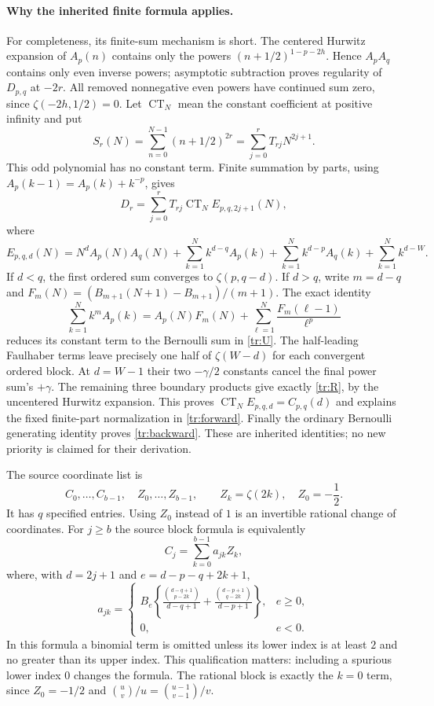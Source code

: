 \paragraph{Why the inherited finite formula applies.}
For completeness, its finite-sum mechanism is short. The centered
Hurwitz expansion of $A_p(n)$ contains only the powers
$(n+1/2)^{1-p-2h}$. Hence $A_pA_q$ contains only even inverse powers;
asymptotic subtraction proves regularity of $D_{p,q}$ at $-2r$.
All removed nonnegative even powers have continued sum zero, since
$\zeta(-2h,1/2)=0$. Let $\operatorname{CT}_N$ mean the constant
coefficient at positive infinity and put
\[
 S_r(N)=\sum_{n=0}^{N-1}(n+1/2)^{2r}
       =\sum_{j=0}^r T_{rj}N^{2j+1}.
\]
This odd polynomial has no constant term. Finite summation by parts,
using $A_p(k-1)=A_p(k)+k^{-p}$, gives
\[
 D_r=\sum_{j=0}^rT_{rj}\operatorname{CT}_N E_{p,q,2j+1}(N),
\]
where
\[
 E_{p,q,d}(N)=N^dA_p(N)A_q(N)
 +\sum_{k=1}^N k^{d-q}A_p(k)
 +\sum_{k=1}^N k^{d-p}A_q(k)
 +\sum_{k=1}^N k^{d-W}.
\]
If $d<q$, the first ordered sum converges to $\zeta(p,q-d)$.
If $d>q$, write $m=d-q$ and
$F_m(N)=(B_{m+1}(N+1)-B_{m+1})/(m+1)$. The exact identity
\[
 \sum_{k=1}^Nk^mA_p(k)
 =A_p(N)F_m(N)+\sum_{\ell=1}^N\frac{F_m(\ell-1)}{\ell^p}
\]
reduces its constant term to the Bernoulli sum in \eqref{tr:U}.
The half-leading Faulhaber terms leave precisely one half of
$\zeta(W-d)$ for each convergent ordered block. At $d=W-1$ their
two $-\gamma/2$ constants cancel the final power sum's $+\gamma$.
The remaining three boundary products give exactly \eqref{tr:R},
by the uncentered Hurwitz expansion. This proves
$\operatorname{CT}_NE_{p,q,d}=C_{p,q}(d)$ and explains the fixed
finite-part normalization in \eqref{tr:forward}. Finally the ordinary
Bernoulli generating identity proves \eqref{tr:backward}. These are
inherited identities; no new priority is claimed for their derivation.

The source coordinate list is
\begin{equation}\label{tr:coordinates}
 C_0,\ldots,C_{b-1},\quad Z_0,\ldots,Z_{b-1},
 \qquad Z_k=\zeta(2k),\quad Z_0=-\frac12.
\end{equation}
It has $q$ specified entries. Using $Z_0$ instead of $1$ is an invertible
rational change of coordinates. For $j\ge b$ the source block formula
is equivalently
\begin{equation}\label{tr:A}
 C_j=\sum_{k=0}^{b-1}a_{jk}Z_k,
\end{equation}
where, with $d=2j+1$ and $e=d-p-q+2k+1$,
\begin{equation}\label{tr:Aentries}
 a_{jk}=
 \begin{cases}
 B_e\left\{
 \displaystyle\frac{\binom{d-q+1}{p-2k}}{d-q+1}
 +\displaystyle\frac{\binom{d-p+1}{q-2k}}{d-p+1}
 \right\},& e\ge0,\\[5pt]
 0,&e<0.
 \end{cases}
\end{equation}
In this formula a binomial term is omitted unless its lower index is at
least $2$ and no greater than its upper index. This qualification matters:
including a spurious lower index $0$ changes the formula. The rational
block is exactly the $k=0$ term, since $Z_0=-1/2$ and
$\binom{u}{v}/u=\binom{u-1}{v-1}/v$.

